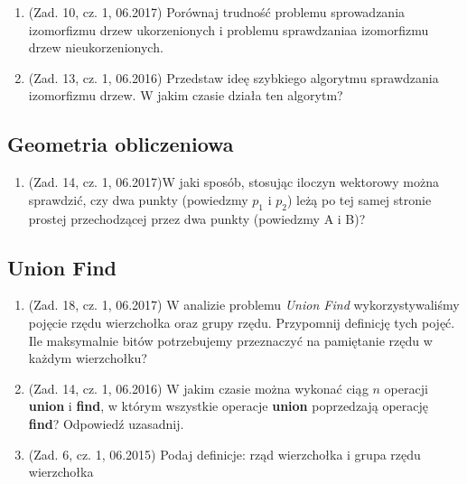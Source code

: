 \documentclass[10pt]{article}%
\begin{document}
\begin{enumerate}

\item (Zad. 10, cz. 1, 06.2017) Porównaj trudność problemu sprowadzania izomorfizmu drzew ukorzenionych i problemu sprawdzaniaa izomorfizmu drzew nieukorzenionych.

\item (Zad. 13, cz. 1, 06.2016) Przedstaw ideę szybkiego algorytmu sprawdzania izomorfizmu drzew. W jakim czasie działa ten algorytm?

\end{enumerate}


\subsection*{Geometria obliczeniowa}

\begin{enumerate}

\item (Zad. 14, cz. 1, 06.2017)W jaki sposób, stosując iloczyn wektorowy można sprawdzić, czy dwa punkty (powiedzmy $p_1$ i $p_2$) leżą po tej samej stronie prostej przechodzącej przez dwa punkty (powiedzmy A i B)?

\end{enumerate}


\subsection*{Union Find}

\begin{enumerate}

\item (Zad. 18, cz. 1, 06.2017) W analizie problemu \emph{Union Find} wykorzystywaliśmy pojęcie rzędu wierzchołka oraz grupy rzędu. Przypomnij definicję tych pojęć. Ile maksymalnie bitów potrzebujemy przeznaczyć na pamiętanie rzędu w każdym wierzchołku?

\item (Zad. 14, cz. 1, 06.2016) W jakim czasie można wykonać ciąg $n$ operacji \textbf{union} i \textbf{find}, w którym wszystkie operacje \textbf{union} poprzedzają operację \textbf{find}? Odpowiedź uzasadnij.

\item (Zad. 6, cz. 1, 06.2015) Podaj definicje: rząd wierzchołka i grupa rzędu wierzchołka

\end{enumerate}
\end{document}
